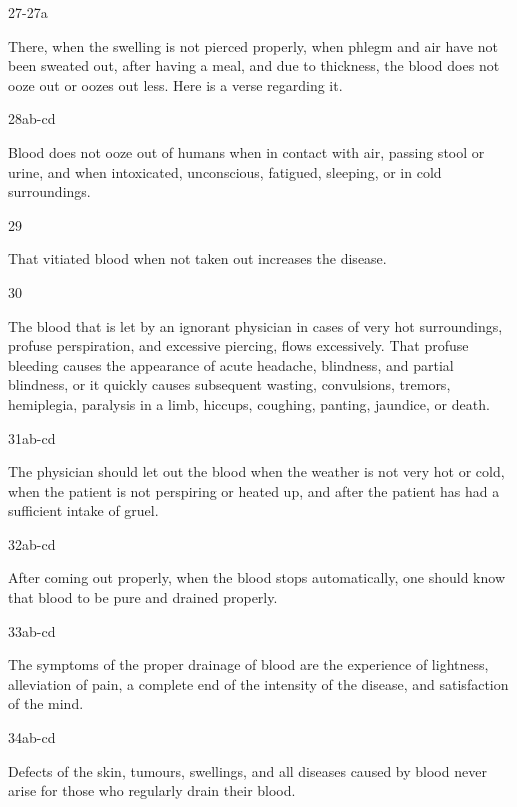 \begin{translation}
\item[27-27a]

There, when the swelling is not pierced properly, when phlegm and air have not been sweated out, after having a meal, and due to thickness, the blood does not ooze out or oozes out less.
Here is a verse regarding it.

\item[28ab-cd]

\begin{sloka}
Blood does not ooze out of humans when in contact with air, passing stool or urine, and when intoxicated, unconscious, fatigued, sleeping, or in cold surroundings.
\end{sloka}

\item[29] 

That vitiated blood when not taken out increases the disease.

\item[30]

The blood that is let by an ignorant physician in cases of very hot surroundings, profuse perspiration, and excessive piercing, flows excessively. That profuse bleeding causes the appearance of acute headache, blindness, and partial blindness, or it quickly causes subsequent wasting, convulsions, tremors, hemiplegia, paralysis in a limb, hiccups, coughing, panting, jaundice, or death.  

\item[31ab-cd]

The physician should let out the blood when the weather is not very hot or cold, when the patient is not perspiring or heated up, and after the patient has had a sufficient intake of gruel. 

\item[32ab-cd]

After coming out properly, when the blood stops automatically, one should know that blood to be pure and drained properly.

\item[33ab-cd]

The symptoms of the proper drainage of blood are the experience of lightness, alleviation of pain, a complete end of the intensity of the disease, and satisfaction of the mind.

\item[34ab-cd] 

Defects of the skin, tumours, swellings, and all diseases caused by blood never arise for those who regularly drain their blood.


\end{translation}

